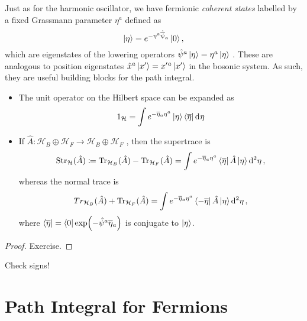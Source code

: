 
Just as for the harmonic oscillator, we have fermionic \emph{coherent states} labelled by a fixed Grassmann parameter $\eta^a$ defined as
 \begin{equation}
  \ket{\eta} = e^{-\eta^a \hat{\overline{\psi}{}}_a} \ket{0},
\end{equation}
which are eigenstates of the lowering operators $\hat{\psi}^a \ket{\eta} = \eta^a \ket{\eta}$ .
These are analogous to position eigenstates $\hat{x}^a \ket{x'} = x'{}^a \ket{x'}$  in the bosonic system.
As such, they are useful building blocks for the path integral.
\begin{claim}
  \begin{itemize}
    \item The unit operator on the Hilbert space can be expanded as
    \begin{equation}
      1_\mathcal{H} = \int e^{- \overline{\eta}{}_a \eta^a} \ket{\eta} \bra{\overline{\eta}{}} \dd[]{\eta}
    \end{equation}
    \item If $\hat{A} \colon \mathcal{H}_B \oplus \mathcal{H}_F \to \mathcal{H}_B \oplus \mathcal{H}_F$ , then the supertrace is
      \begin{equation}
	\text{Str}_{\mathcal{H}}(\hat{A}) \coloneqq \Tr_{\mathcal{H}_B}(\hat{A}) - \Tr_{\mathcal{H}_F}(\hat{A}) = \int e^{- \overline{\eta}{}_a \eta^a} \bra{\overline{\eta}{}} \hat{A} \ket{\eta} \dd[2]{\eta},
      \end{equation}
      whereas the normal trace is
      \begin{equation}
	Tr_{\mathcal{H}_B}(\hat{A}) + \Tr_{\mathcal{H}_F}(\hat{A}) = \int e^{-\overline{\eta}{}_a \eta^a} \bra{-\overline{\eta}{}} \hat{A} \ket{\eta} \dd[2]{\eta},
      \end{equation}
      where $\bra{\overline{\eta}{}} = \bra{0} \exp(- \hat{\psi}^a \overline{\eta}{}_a)$ is conjugate to $\ket{\eta}$.
  \end{itemize}
\end{claim}
\begin{proof}
  Exercise.
\end{proof}
\begin{exercise}
  Check signs!
\end{exercise}

\section{Path Integral for Fermions}%
\label{sec:path_integral_for_fermions}

